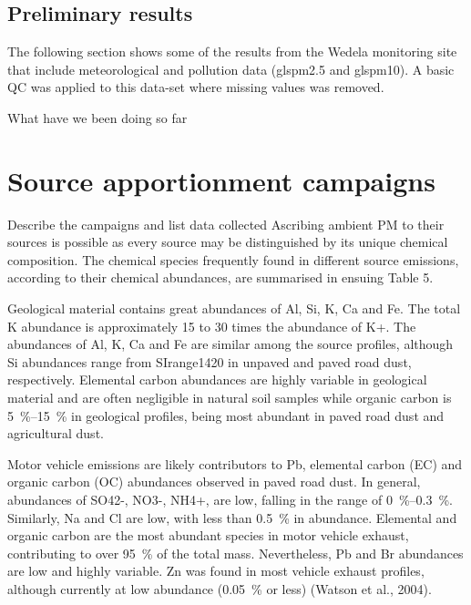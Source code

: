 \documentclass{nwureport}
\begin{document}
\section{Preliminary results}

The following section shows some of the results from the Wedela monitoring site that include meteorological
and pollution data (gls{pm2.5} and gls{pm10}). A basic QC was applied to this data-set where missing values was removed.




What have we been doing so far


\chapter{Source apportionment campaigns}

Describe the campaigns and list data collected
Ascribing ambient PM to their sources is possible as every source may be distinguished by its unique chemical composition. The chemical species frequently found in different source emissions, according to their chemical abundances, are summarised in ensuing Table 5. 

Geological material contains great abundances of Al, Si, K, Ca and Fe. The total K abundance is approximately \num{15} to \num{30} times the abundance of K+. The abundances of Al, K, Ca and Fe are similar among the source profiles, although Si abundances range from SIrange{14}{20}{\percent} in unpaved and paved road dust, respectively. Elemental carbon abundances are highly variable in geological material and are often negligible in natural soil samples while organic carbon is \SIrange{5}{15}{\percent} in geological profiles, being most abundant in paved road dust and agricultural dust. 

Motor vehicle emissions are likely contributors to Pb, elemental carbon (EC) and organic carbon (OC) abundances observed in paved road dust. In general, abundances of SO42-, NO3-, NH4+, are low, falling in the range of \SIrange{0}{0.3}{\percent}. Similarly, Na and Cl are low, with less than \SI{0.5}{\percent} in abundance. Elemental and organic carbon are the most abundant species in motor vehicle exhaust, contributing to over \SI{95}{\percent} of the total mass. Nevertheless, Pb and Br abundances are low and highly variable. Zn was found in most vehicle exhaust profiles, although currently at low abundance (\SI{0.05}{\percent} or less) (Watson et al., 2004).
\end{document}
